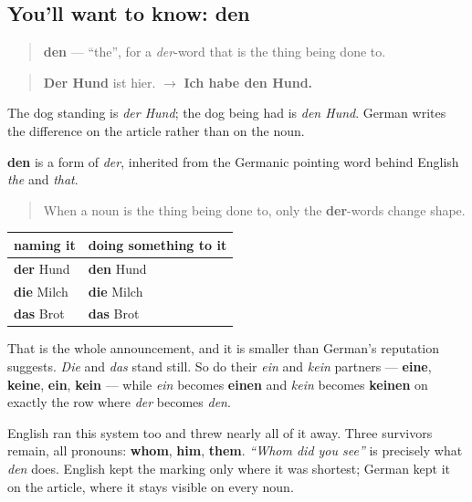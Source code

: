 \subsection*{You'll want to know: den}
\begin{quote}
\textbf{den} — \textquotedblleft{}the\textquotedblright{}, for a \emph{der}-word that is the thing being done to.
\end{quote}

\begin{quote}
\textbf{Der Hund} ist hier. $\to$ \textbf{Ich habe den Hund.}
\end{quote}

The dog standing is \emph{der Hund}; the dog being had is \emph{den Hund}. German writes the difference on the article rather than on the noun.

\begin{cousinweb}
\textbf{den} is a form of \emph{der}, inherited from the Germanic pointing word behind English \emph{the} and \emph{that}.
\end{cousinweb}

\begin{grammarlens}[title={Grammar Lens: one row of three moves}]
\begin{quote}
When a noun is the thing being done to, only the \textbf{der}-words change shape.
\end{quote}

\noindent
\begin{tabularx}{\linewidth}{@{}>{\raggedright\arraybackslash}X>{\raggedright\arraybackslash}X@{}}
\toprule
\textbf{naming it} & \textbf{doing something to it} \\
\midrule
\textbf{der} Hund & \textbf{den} Hund \\
\textbf{die} Milch & \textbf{die} Milch \\
\textbf{das} Brot & \textbf{das} Brot \\
\bottomrule
\end{tabularx}

That is the whole announcement, and it is smaller than German's reputation suggests. \emph{Die} and \emph{das} stand still. So do their \emph{ein} and \emph{kein} partners — \textbf{eine}, \textbf{keine}, \textbf{ein}, \textbf{kein} — while \emph{ein} becomes \textbf{einen} and \emph{kein} becomes \textbf{keinen} on exactly the row where \emph{der} becomes \emph{den}.
\end{grammarlens}

\begin{culture}
English ran this system too and threw nearly all of it away. Three survivors remain, all pronouns: \textbf{whom}, \textbf{him}, \textbf{them}. \emph{\textquotedblleft{}Whom did you see\textquotedblright{}} is precisely what \emph{den} does. English kept the marking only where it was shortest; German kept it on the article, where it stays visible on every noun.
\end{culture}

